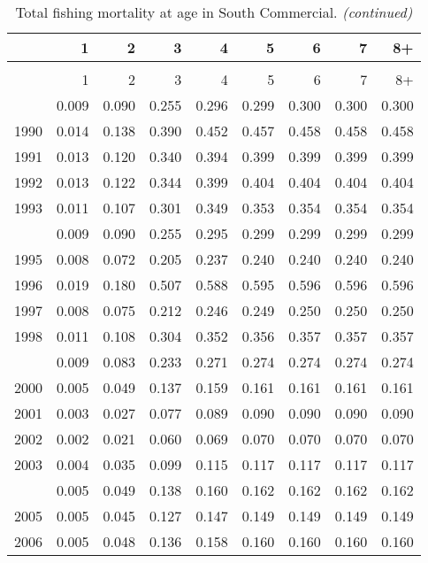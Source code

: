 \documentclass[
]{article}
\begin{document}
\begin{longtable}[t]{lrrrrrrrr}
\caption{\label{tab:South_Commercial-fleet-FAA-table}Total fishing mortality at age in South Commercial.}\\
\toprule
  & 1 & 2 & 3 & 4 & 5 & 6 & 7 & 8+\\
\midrule
\endfirsthead
\caption[]{Total fishing mortality at age in South Commercial. \textit{(continued)}}\\
\toprule
  & 1 & 2 & 3 & 4 & 5 & 6 & 7 & 8+\\
\midrule
\endhead

\endfoot
\bottomrule
\endlastfoot
1989 & 0.009 & 0.090 & 0.255 & 0.296 & 0.299 & 0.300 & 0.300 & 0.300\\
1990 & 0.014 & 0.138 & 0.390 & 0.452 & 0.457 & 0.458 & 0.458 & 0.458\\
1991 & 0.013 & 0.120 & 0.340 & 0.394 & 0.399 & 0.399 & 0.399 & 0.399\\
1992 & 0.013 & 0.122 & 0.344 & 0.399 & 0.404 & 0.404 & 0.404 & 0.404\\
1993 & 0.011 & 0.107 & 0.301 & 0.349 & 0.353 & 0.354 & 0.354 & 0.354\\
\addlinespace
1994 & 0.009 & 0.090 & 0.255 & 0.295 & 0.299 & 0.299 & 0.299 & 0.299\\
1995 & 0.008 & 0.072 & 0.205 & 0.237 & 0.240 & 0.240 & 0.240 & 0.240\\
1996 & 0.019 & 0.180 & 0.507 & 0.588 & 0.595 & 0.596 & 0.596 & 0.596\\
1997 & 0.008 & 0.075 & 0.212 & 0.246 & 0.249 & 0.250 & 0.250 & 0.250\\
1998 & 0.011 & 0.108 & 0.304 & 0.352 & 0.356 & 0.357 & 0.357 & 0.357\\
\addlinespace
1999 & 0.009 & 0.083 & 0.233 & 0.271 & 0.274 & 0.274 & 0.274 & 0.274\\
2000 & 0.005 & 0.049 & 0.137 & 0.159 & 0.161 & 0.161 & 0.161 & 0.161\\
2001 & 0.003 & 0.027 & 0.077 & 0.089 & 0.090 & 0.090 & 0.090 & 0.090\\
2002 & 0.002 & 0.021 & 0.060 & 0.069 & 0.070 & 0.070 & 0.070 & 0.070\\
2003 & 0.004 & 0.035 & 0.099 & 0.115 & 0.117 & 0.117 & 0.117 & 0.117\\
\addlinespace
2004 & 0.005 & 0.049 & 0.138 & 0.160 & 0.162 & 0.162 & 0.162 & 0.162\\
2005 & 0.005 & 0.045 & 0.127 & 0.147 & 0.149 & 0.149 & 0.149 & 0.149\\
2006 & 0.005 & 0.048 & 0.136 & 0.158 & 0.160 & 0.160 & 0.160 & 0.160\\

\end{longtable}
\end{document}
